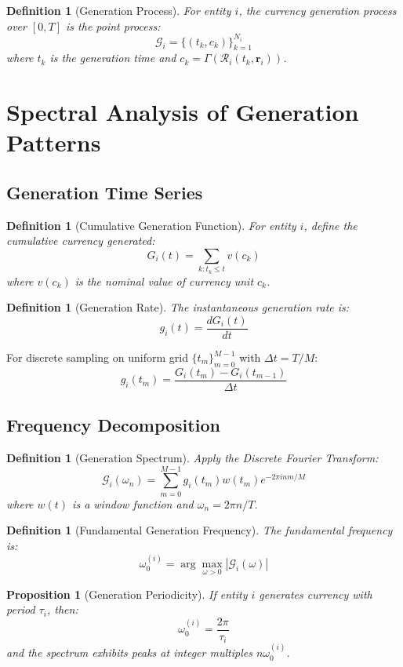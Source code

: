 \documentclass[12pt]{article}
\newtheorem{definition}[theorem]{Definition}
\newtheorem{proposition}[theorem]{Proposition}
\begin{document}
\begin{definition}[Generation Process]
For entity $i$, the currency generation process over $[0,T]$ is the point process:
$$
\mathcal{G}_i = \{(t_k, c_k)\}_{k=1}^{N_i}
$$
where $t_k$ is the generation time and $c_k = \Gamma(\mathcal{R}_i(t_k, \mathbf{r}_i))$.
\end{definition}

\section{Spectral Analysis of Generation Patterns}

\subsection{Generation Time Series}

\begin{definition}[Cumulative Generation Function]
For entity $i$, define the cumulative currency generated:
$$
G_i(t) = \sum_{k: t_k \leq t} v(c_k)
$$
where $v(c_k)$ is the nominal value of currency unit $c_k$.
\end{definition}

\begin{definition}[Generation Rate]
The instantaneous generation rate is:
$$
g_i(t) = \frac{dG_i(t)}{dt}
$$
\end{definition}

For discrete sampling on uniform grid $\{t_m\}_{m=0}^{M-1}$ with $\Delta t = T/M$:
$$
g_i(t_m) = \frac{G_i(t_m) - G_i(t_{m-1})}{\Delta t}
$$

\subsection{Frequency Decomposition}

\begin{definition}[Generation Spectrum]
Apply the Discrete Fourier Transform:
$$
\mathcal{G}_i(\omega_n) = \sum_{m=0}^{M-1} g_i(t_m) w(t_m) e^{-2\pi i nm/M}
$$
where $w(t)$ is a window function and $\omega_n = 2\pi n/T$.
\end{definition}

\begin{definition}[Fundamental Generation Frequency]
The fundamental frequency is:
$$
\omega_0^{(i)} = \arg\max_{\omega > 0} |\mathcal{G}_i(\omega)|
$$
\end{definition}

\begin{proposition}[Generation Periodicity]
If entity $i$ generates currency with period $\tau_i$, then:
$$
\omega_0^{(i)} = \frac{2\pi}{\tau_i}
$$
and the spectrum exhibits peaks at integer multiples $n\omega_0^{(i)}$.
\end{proposition}
\end{document}
